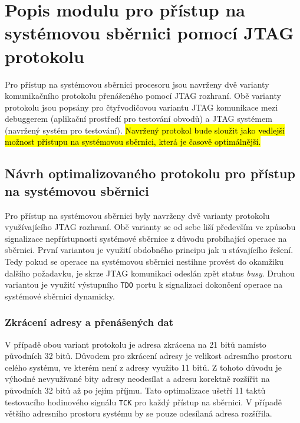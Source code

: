 \chapter{Popis modulu pro přístup na systémovou sběrnici pomocí JTAG protokolu}	\label{jtag_ap}
Pro přístup na systémovou sběrnici procesoru jsou navrženy dvě varianty komunikačního protokolu přenášeného pomocí JTAG rozhraní. Obě varianty protokolu jsou popsány pro čtyřvodičovou variantu \acs{JTAG} komunikace mezi debuggerem (aplikační prostředí pro testování obvodů) a \acs{JTAG} systémem (navržený systém pro testování). \hl{Navržený protokol bude sloužit jako vedlejší možnost přístupu na systémovou sběrnici, která je časově optimálnější.}

\section{Návrh optimalizovaného protokolu pro přístup na systémovou sběrnici}	\label{sec:protokoly}
Pro přístup na systémovou sběrnici byly navrženy dvě varianty protokolu využívajícího JTAG rozhraní. Obě varianty se od sebe liší především ve způsobu signalizace nepřístupnosti systémové sběrnice z důvodu probíhající operace na sběrnici. První variantou je využití obdobného principu jak u stávajícího řešení. Tedy pokud se operace na systémovou sběrnici nestihne provést do okamžiku dalšího požadavku, je skrze JTAG komunikaci odeslán zpět status \textit{busy}. Druhou variantou je využití výstupního \texttt{\acs{TDO}} portu k signalizaci dokončení operace na systémové sběrnici dynamicky.

\subsection{Zkrácení adresy a přenášených dat}
V případě obou variant protokolu je adresa zkrácena na 21 bitů namísto původních 32 bitů. Důvodem pro zkrácení adresy je velikost adresního prostoru celého systému, ve kterém není z adresy využito 11 bitů. Z tohoto důvodu je výhodné nevyužívané bity adresy neodesílat a adresu korektně rozšířit na původních 32 bitů až po jejím příjmu. Tato optimalizace ušetří 11 taktů testovacího hodinového signálu \texttt{\acs{TCK}} pro každý přístup na sběrnici. V případě většího adresního prostoru systému by se pouze odesílaná adresa rozšířila.


